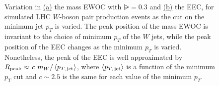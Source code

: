 \begin{figure}[t!]
    \centering
    \caption[Variations in the mass EWOC and the EEC in simulated LHC \(W\)-boson pair production events as the cut on the minimum jet \(p_T\) is varied.]{
        Variation in
        \hyperref[fig:m_ewoc:pp_to_ww:compare-pT]{(a)}
        the mass EWOC with \(\rsub=0.3\) and
        \hyperref[fig:eec:pp_to_ww:compare-pT]{(b)}
        the EEC, for simulated LHC \(W\)-boson pair production events as the cut on the minimum jet \(p_T\) is varied.
        The peak position of the mass EWOC is invariant to the choice of minimum \(p_T\) of the \(W\) jets, while the peak position of the EEC changes as the minimum \(p_T\) is varied.
        Nonetheless, the peak of the EEC is well approximated by \(R_\text{peak} \approx \, c \,\,  m_W / \left\langle p_{T,\,\text{jet}}\right\rangle\), where \(\left\langle p_{T,\,\text{jet}}\right\rangle\) is a function of the minimum \(p_T\) cut and \(c \sim 2.5\) is the same for each value of the minimum \(p_T\).
    }
    \label{fig:pp_to_ww:compare-pts}
\end{figure}




